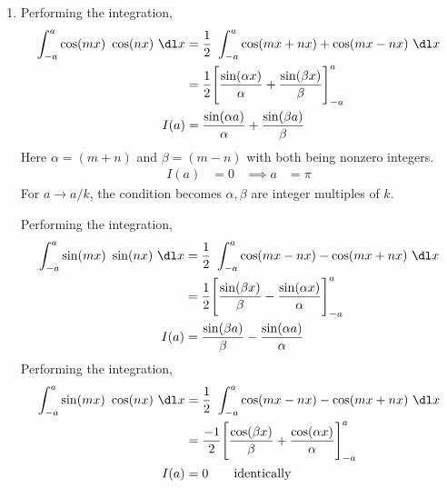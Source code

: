 \begin{enumerate}
    \item Performing the integration,
          \begin{align}
              \int_{-a}^{a} \cos(mx)\ \cos(nx)\ \dl x &
              = \frac{1}{2}\ \int_{-a}^{a} \cos(mx + nx)
              + \cos(mx - nx)\ \dl x                    \\
                                                      &
              = \frac{1}{2}\Bigg[ \frac{\sin(\alpha x)}{\alpha}
                  + \frac{\sin(\beta x)}{\beta}
              \Bigg]_{-a}^{a}                           \\
              I(a)                                    &
              = \frac{\sin(\alpha a)}{\alpha} + \frac{\sin(\beta a)}{\beta}
          \end{align}
          Here $ \alpha = (m+n) $ and $ \beta = (m-n) $ with both being nonzero integers.
          \begin{align}
              I(a)       & = 0   &
              \implies a & = \pi
          \end{align}
          For $ a \rightarrow a/k $, the condition becomes $ \alpha, \beta $ are
          integer multiples of $ k $. \par
          Performing the integration,
          \begin{align}
              \int_{-a}^{a} \sin(mx)\ \sin(nx)\ \dl x &
              = \frac{1}{2}\ \int_{-a}^{a} \cos(mx - nx)
              - \cos(mx + nx)\ \dl x                    \\
                                                      &
              = \frac{1}{2}\Bigg[ \frac{\sin(\beta x)}{\beta}
                  - \frac{\sin(\alpha x)}{\alpha}
              \Bigg]_{-a}^{a}                           \\
              I(a)                                    &
              = \frac{\sin(\beta a)}{\beta} - \frac{\sin(\alpha a)}{\alpha}
          \end{align}
          Performing the integration,
          \begin{align}
              \int_{-a}^{a} \sin(mx)\ \cos(nx)\ \dl x &
              = \frac{1}{2}\ \int_{-a}^{a} \cos(mx - nx)
              - \cos(mx + nx)\ \dl x                    \\
                                                      &
              = \frac{-1}{2}\Bigg[ \frac{\cos(\beta x)}{\beta}
                  + \frac{\cos(\alpha x)}{\alpha}
              \Bigg]_{-a}^{a}                           \\
              I(a)                                    &
              = 0 \qquad \text{identically}
          \end{align}


\end{enumerate}
